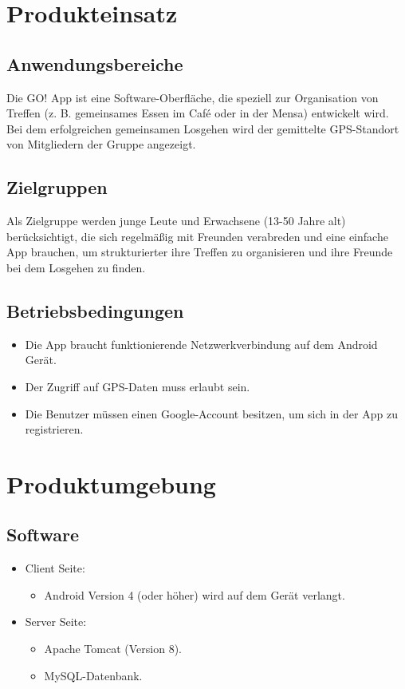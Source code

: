 \documentclass[parskip=full]{scrartcl}
\begin{document}
\newpage
\section{Produkteinsatz}
\subsection{Anwendungsbereiche}
Die GO! App ist eine Software-Oberfläche, die speziell zur Organisation von Treffen (z. B. gemeinsames Essen im Café oder in der Mensa) entwickelt wird. Bei dem erfolgreichen gemeinsamen Losgehen wird der gemittelte GPS-Standort von Mitgliedern der Gruppe angezeigt.
 
\subsection{Zielgruppen}
Als Zielgruppe werden junge Leute und Erwachsene (13-50 Jahre alt) berücksichtigt, die sich regelmäßig mit Freunden verabreden und eine einfache App brauchen, um strukturierter ihre Treffen zu organisieren und ihre Freunde bei dem Losgehen zu finden.

\subsection{Betriebsbedingungen}\label{Betriebsbedingungen}
\begin{itemize}
	\item Die App braucht funktionierende Netzwerkverbindung auf dem Android Gerät.\\
	\item Der Zugriff auf GPS-Daten muss erlaubt sein.\\
	\item Die Benutzer müssen einen \gls{Google-Account} besitzen, um sich in der App zu registrieren.
\end{itemize}

\newpage
\section{Produktumgebung}

\subsection{Software}
\begin{itemize}
	\item Client Seite:
	\begin{itemize}
		\item Android Version 4 (oder höher) wird auf dem Gerät verlangt.
	\end{itemize}
	
	\item Server Seite:
	\begin{itemize} 
        \item Apache Tomcat (Version 8).
		\item MySQL-Datenbank. %
    \end{itemize}
\end{itemize}
\end{document}
